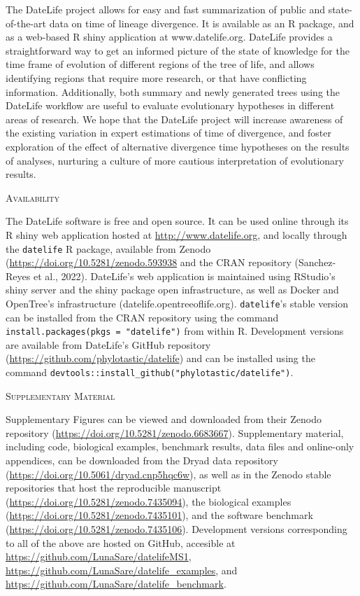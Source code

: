 \documentclass[english,man]{apa6}
\begin{document}
The DateLife project allows for easy and fast summarization of public and state-of-the-art data on time of lineage divergence.
It is available as an R package, and as a web-based R shiny application at www.datelife.org.
DateLife provides a straightforward way to get an informed picture of the state of knowledge for the time frame of evolution of different regions of the tree of life, and allows identifying regions that require more research, or that have conflicting information.
Additionally, both summary and newly generated trees using the DateLife workflow are useful to evaluate evolutionary hypotheses in different areas of research. We hope that the DateLife project will increase awareness of the existing variation in expert estimations of time of divergence, and foster exploration of the effect of alternative divergence time hypotheses on the results of analyses, nurturing a culture of more cautious interpretation of evolutionary results.

\begin{center}
\textsc{Availability}
\end{center}

The DateLife software is free and open source. It can be used online through its R shiny web application hosted at \url{http://www.datelife.org}, and locally through the \texttt{datelife} R package, available from Zenodo (\url{https://doi.org/10.5281/zenodo.593938} and the CRAN repository (Sanchez-Reyes et al., 2022).
DateLife's web application is maintained using RStudio's shiny server and the shiny package open infrastructure, as well as Docker and OpenTree's infrastructure (datelife.opentreeoflife.org).
\texttt{datelife}'s stable version can be installed from the CRAN repository using the command \texttt{install.packages(pkgs\ =\ "datelife")} from within R.
Development versions are available from DateLife's GitHub repository (\url{https://github.com/phylotastic/datelife}) and can be installed using the command \texttt{devtools::install\_github("phylotastic/datelife")}.

\begin{center}
\textsc{Supplementary Material}
\end{center}

Supplementary Figures can be viewed and downloaded from their Zenodo repository (\url{https://doi.org/10.5281/zenodo.6683667}).
Supplementary material, including code, biological examples, benchmark results, data files and online-only appendices, can be downloaded from the Dryad data repository (\url{https://doi.org/10.5061/dryad.cnp5hqc6w}), as well as in the Zenodo stable repositories that host the reproducible manuscript (\url{https://doi.org/10.5281/zenodo.7435094}), the biological examples (\url{https://doi.org/10.5281/zenodo.7435101}), and the software benchmark (\url{https://doi.org/10.5281/zenodo.7435106}). Development versions corresponding to all of the above are hosted on GitHub, accesible at \url{https://github.com/LunaSare/datelifeMS1}, \url{https://github.com/LunaSare/datelife_examples}, and \url{https://github.com/LunaSare/datelife_benchmark}.
\end{document}
